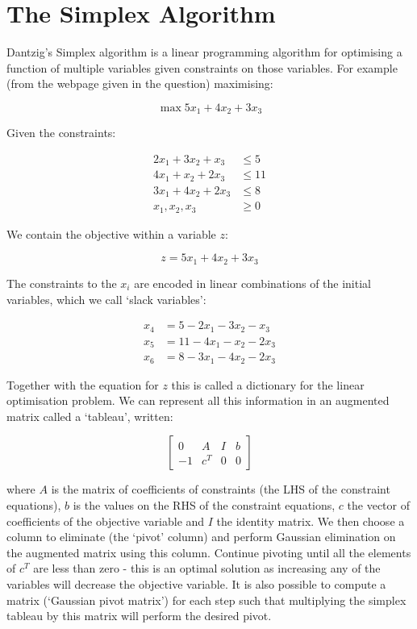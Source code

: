\documentclass[11pt]{article} %
\begin{document}
\section{The Simplex Algorithm}
Dantzig's Simplex algorithm is a linear programming algorithm for optimising a function of multiple variables given constraints on those variables. For example (from the webpage given in the question) maximising:

\begin{equation}
\max 5x_{1}+4x_{2}+3x_{3}
\end{equation}

Given the constraints:

\begin{align}
2x_{1} + 3x_{2} + x_{3}& \leq 5 \\
4x_{1} + x_{2} + 2x_{3}& \leq 11 \\
3x_{1} + 4x_{2} + 2x_{3}& \leq 8 \\
x_{1}, x_{2}, x_{3}& \geq 0
\end{align}

We contain the objective within a variable $z$:

\begin{equation}
z = 5x_{1} + 4x_{2} + 3x_{3}
\end{equation}

The constraints to the $x_{i}$ are encoded in linear combinations of the initial variables, which we call `slack variables':

\begin{align}
x_{4} &= 5 - 2x_{1} - 3x_{2} - x_{3}\\
x_{5} &= 11 - 4x_{1} - x_{2} - 2x_{3}\\
x_{6} &= 8 - 3x_{1} - 4x_{2} -2x_{3}
\end{align}

Together with the equation for $z$ this is called a dictionary for the linear optimisation problem. We can represent all this information in an augmented matrix called a `tableau', written:

\begin{equation}
\begin{bmatrix}
0 & A & I & b\\
-1 & c^{T} &0 &0
\end{bmatrix}
\end{equation}

where $A$ is the matrix of coefficients of constraints (the LHS of the constraint equations), $b$ is the values on the RHS of the constraint equations, $c$ the vector of coefficients of the objective variable and $I$ the identity matrix. We then choose a column to eliminate (the `pivot' column) and perform Gaussian elimination on the augmented matrix using this column. Continue pivoting until all the elements of $c^{T}$ are less than zero - this is an optimal solution as increasing any of the variables will decrease the objective variable. It is also possible to compute a matrix (`Gaussian pivot matrix') for each step such that multiplying the simplex tableau by this matrix will perform the desired pivot.
\end{document}

